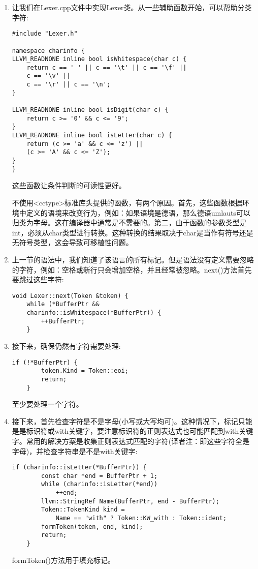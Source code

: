 \begin{enumerate}
\item 让我们在Lexer.cpp文件中实现Lexer类。从一些辅助函数开始，可以帮助分类字符:
\begin{lstlisting}[caption={}]
#include "Lexer.h"

namespace charinfo {
LLVM_READNONE inline bool isWhitespace(char c) {
	return c == ' ' || c == '\t' || c == '\f' ||
	c == '\v' ||
	c == '\r' || c == '\n';
}

LLVM_READNONE inline bool isDigit(char c) {
	return c >= '0' && c <= '9';
}
LLVM_READNONE inline bool isLetter(char c) {
	return (c >= 'a' && c <= 'z') ||
	(c >= 'A' && c <= 'Z');
}
}
\end{lstlisting}
这些函数让条件判断的可读性更好。
\begin{tcolorbox}[colback=blue!5!white,colframe=blue!75!black,title=Note]
不使用<cctype>标准库头提供的函数，有两个原因。首先，这些函数根据环境中定义的语境来改变行为，例如：如果语境是德语，那么德语umlauts可以归类为字母。这在编译器中通常是不需要的。第二，由于函数的参数类型是int，必须从char类型进行转换。这种转换的结果取决于char是当作有符号还是无符号类型，这会导致可移植性问题。
\end{tcolorbox}

\item 上一节的语法中，我们知道了该语言的所有标记。但是语法没有定义需要忽略的字符，例如：空格或新行只会增加空格，并且经常被忽略。next()方法首先要跳过这些字符:
\begin{lstlisting}[caption={}]
void Lexer::next(Token &token) {
	while (*BufferPtr &&
	charinfo::isWhitespace(*BufferPtr)) {
		++BufferPtr;
	}
\end{lstlisting}

\item 接下来，确保仍然有字符需要处理:
\begin{lstlisting}[caption={}]
	if (!*BufferPtr) {
		token.Kind = Token::eoi;
		return;
	}
\end{lstlisting}
至少要处理一个字符。
	
\item 接下来，首先检查字符是不是字母(小写或大写均可)。这种情况下，标记只能是是标识符或with关键字，要注意标识符的正则表达式也可能匹配到with关键字。常用的解决方案是收集正则表达式匹配的字符(译者注：即这些字符全是字母)，并检查字符串是不是with关键字:
\begin{lstlisting}[caption={}]
	if (charinfo::isLetter(*BufferPtr)) {
		const char *end = BufferPtr + 1;
		while (charinfo::isLetter(*end))
			++end;
		llvm::StringRef Name(BufferPtr, end - BufferPtr);
		Token::TokenKind kind =
			Name == "with" ? Token::KW_with : Token::ident;
		formToken(token, end, kind);
		return;
	}
\end{lstlisting}
formToken()方法用于填充标记。


\end{enumerate}
